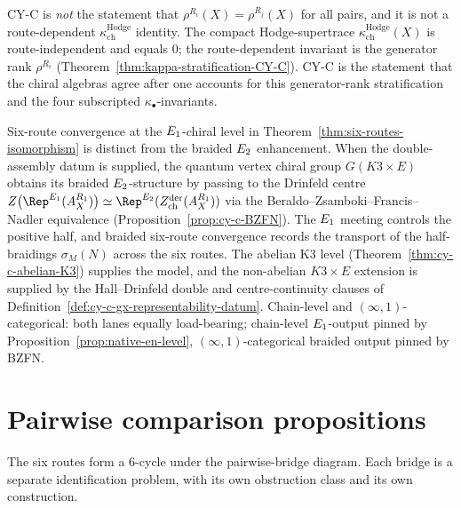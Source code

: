 \begin{remark}
\label{rem:cy-c-exclusions}
CY-C is \emph{not} the statement that $\rho^{R_i}(X) = \rho^{R_j}(X)$ for all pairs, and it is not a route-dependent $\kappa_{\mathrm{ch}}^{\mathrm{Hodge}}$ identity. The compact Hodge-supertrace $\kappa_{\mathrm{ch}}^{\mathrm{Hodge}}(X)$ is route-independent and equals $0$; the route-dependent invariant is the generator rank $\rho^{R_i}$ (Theorem~\ref{thm:kappa-stratification-CY-C}). CY-C is the statement that the chiral algebras agree after one accounts for this generator-rank stratification and the four subscripted $\kappa_\bullet$-invariants.
\end{remark}

\begin{remark}
\label{rem:cy-c-e2-braided-enhancement}
Six-route convergence at the $E_{1}$-chiral level in
Theorem~\ref{thm:six-routes-isomorphism} is distinct from the braided
$E_{2}$ enhancement. When the double-assembly datum is supplied, the
quantum vertex chiral group $G(K3 \times E)$ obtains its braided
$E_{2}$-structure by passing to the Drinfeld centre
$Z\bigl(\Rep^{\Eone}(A_X^{R_1})\bigr) \simeq
\Rep^{\Etwo}(Z^{\mathrm{der}}_{\mathrm{ch}}(A_X^{R_1}))$ via the
Beraldo--Zsamboki--Francis--Nadler equivalence
(Proposition~\ref{prop:cy-c-BZFN}). The $E_{1}$ meeting controls
the positive half, and braided six-route convergence records the
transport of the half-braidings $\sigma_M(N)$ across the six routes.
The abelian K3 level (Theorem~\ref{thm:cy-c-abelian-K3}) supplies the
model, and the non-abelian $K3\times E$ extension is supplied by the
Hall--Drinfeld double and centre-continuity clauses of
Definition~\ref{def:cy-c-gx-representability-datum}.
Chain-level and $(\infty, 1)$-categorical: both lanes equally
load-bearing; chain-level $E_{1}$-output pinned by
Proposition~\ref{prop:native-en-level}, $(\infty, 1)$-categorical
braided output pinned by BZFN.
\end{remark}

\section{Pairwise comparison propositions}
\label{sec:cy-c-pairwise}

The six routes form a $6$-cycle under the pairwise-bridge diagram. Each bridge is a separate identification problem, with its own obstruction class and its own construction.

